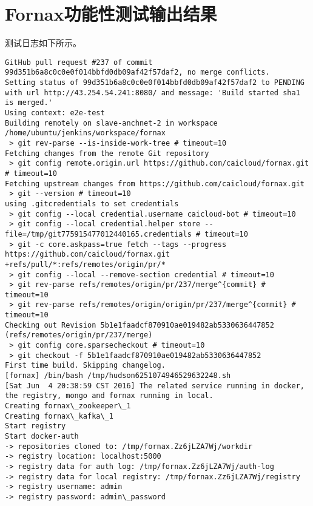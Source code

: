 
\chapter{Fornax功能性测试输出结果}
\label{chap:test-result}

测试日志如下所示。

\begin{lstlisting}[caption={Fornax功能性测试日志}]
GitHub pull request #237 of commit 99d351b6a8c0c0e0f014bbfd0db09af42f57daf2, no merge conflicts.
Setting status of 99d351b6a8c0c0e0f014bbfd0db09af42f57daf2 to PENDING with url http://43.254.54.241:8080/ and message: 'Build started sha1 is merged.'
Using context: e2e-test
Building remotely on slave-anchnet-2 in workspace /home/ubuntu/jenkins/workspace/fornax
 > git rev-parse --is-inside-work-tree # timeout=10
Fetching changes from the remote Git repository
 > git config remote.origin.url https://github.com/caicloud/fornax.git # timeout=10
Fetching upstream changes from https://github.com/caicloud/fornax.git
 > git --version # timeout=10
using .gitcredentials to set credentials
 > git config --local credential.username caicloud-bot # timeout=10
 > git config --local credential.helper store --file=/tmp/git775915477012440165.credentials # timeout=10
 > git -c core.askpass=true fetch --tags --progress https://github.com/caicloud/fornax.git +refs/pull/*:refs/remotes/origin/pr/*
 > git config --local --remove-section credential # timeout=10
 > git rev-parse refs/remotes/origin/pr/237/merge^{commit} # timeout=10
 > git rev-parse refs/remotes/origin/origin/pr/237/merge^{commit} # timeout=10
Checking out Revision 5b1e1faadcf870910ae019482ab5330636447852 (refs/remotes/origin/pr/237/merge)
 > git config core.sparsecheckout # timeout=10
 > git checkout -f 5b1e1faadcf870910ae019482ab5330636447852
First time build. Skipping changelog.
[fornax] /bin/bash /tmp/hudson6251074946529632248.sh
[Sat Jun  4 20:38:59 CST 2016] The related service running in docker, the registry, mongo and fornax running in local.
Creating fornax\_zookeeper\_1
Creating fornax\_kafka\_1
Start registry
Start docker-auth
-> repositories cloned to: /tmp/fornax.Zz6jLZA7Wj/workdir
-> registry location: localhost:5000
-> registry data for auth log: /tmp/fornax.Zz6jLZA7Wj/auth-log
-> registry data for local registry: /tmp/fornax.Zz6jLZA7Wj/registry
-> registry username: admin
-> registry password: admin\_password

\end{lstlisting}
